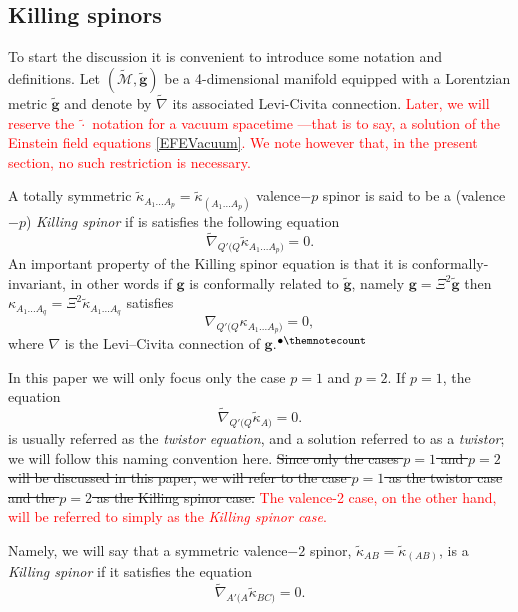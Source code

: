 \documentclass[10pt,a4paper]{article}
\theoremstyle{plain}
\def\bmg{{\bm g}}
\newcounter{mnotecount}%
\newcommand{\mnotex}[1]%
{\protect{\stepcounter{mnotecount}}$^{\mbox{\footnotesize $\bullet$\themnotecount}}$ 
\marginpar{%
\raggedright\tiny\em
$\!\!\!\!\!\!\,\bullet$\themnotecount: #1} }
\begin{document}
\subsection{Killing spinors}\label{Sec:KillingSpinors}

To start the discussion it is convenient to introduce some notation
and definitions. Let $(\tilde{\mathcal{M}},\tilde{\bmg})$ be a
4-dimensional manifold equipped with a Lorentzian metric
$\tilde{\bmg}$ and denote by $\tilde{\nabla}$ its associated
Levi-Civita connection.\textcolor{red}{ Later, we will reserve the $\tilde{\cdot}$ notation for a vacuum spacetime 
---that is to say, a solution of the Einstein field equations \eqref{EFEVacuum}. We note however that,
 in the present section, no such restriction is necessary.}

A totally symmetric
$\tilde{\kappa}_{A_1...A_p}=\tilde{\kappa}_{(A_1...A_p)}$ valence$-p$
spinor is said to be a (valence$-p$) \emph{Killing spinor}
if is satisfies the following equation 
\begin{equation}\label{qValenceKillingspinor}
\tilde{\nabla}_{Q'(Q}\tilde{\kappa}_{A_1...A_p)}=0.
\end{equation}
An important property of the Killing spinor equation is that it is
conformally-invariant, in other words if $\bmg$ is conformally related
to $\tilde{\bmg}$, namely $\bmg=\Xi^2\tilde{\bmg}$ then
${\kappa}_{A_1...A_q}=\Xi^2 \tilde{\kappa}_{A_1...A_q}$ satisfies
\[{\nabla}_{Q'(Q}{\kappa}_{A_1...A_p)}=0,\]
where ${\nabla}$ is the Levi--Civita connection of ${\bmg}$.\mnotex{Already clear?}

\medskip
\noindent In this paper we will only focus only the case $p=1$ and $p=2$.
If $p=1$, the equation
\begin{equation}\label{TwistorEq}
  \tilde{\nabla}_{Q'(Q}\tilde{\kappa}_{A)}=0.
\end{equation}
is usually referred as the \emph{twistor equation}, and a solution referred to as a \emph{twistor}; we will follow
this naming convention here.  \sout{Since only the cases $p=1$ and
$p=2$ will be discussed in this paper, we will refer to the case $p=1$
as the twistor case and the $p=2$ as the Killing spinor case. } \textcolor{red}{The valence-2 case, on the other hand, will be 
referred to simply as the \emph{Killing spinor case}.}

Namely,
we will say that a symmetric valence$-2$ spinor,
$\tilde{\kappa}_{AB}=\tilde{\kappa}_{(AB)}$, is a \textit{Killing
  spinor} if it satisfies the equation
\begin{equation}
\tilde{\nabla}_{A'(A}\tilde{\kappa}_{BC)}=0.
\end{equation}
\end{document}
